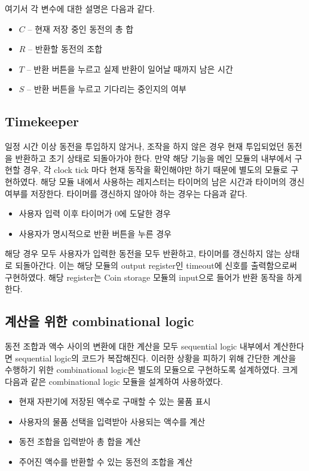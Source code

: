 \documentclass{scrartcl}
\begin{document}
여기서 각 변수에 대한 설명은 다음과 같다.

\begin{itemize}
  \item \(C\) -- 현재 저장 중인 동전의 총 합
  \item \(R\) -- 반환할 동전의 조합
  \item \(T\) -- 반환 버튼을 누르고 실제 반환이 일어날 때까지 남은 시간
  \item \(S\) -- 반환 버튼을 누르고 기다리는 중인지의 여부
\end{itemize}

\subsection{Timekeeper}
일정 시간 이상 동전을 투입하지 않거나, 조작을 하지 않은 경우 현재 투입되었던 동전을 반환하고 초기 상태로 되돌아가야 한다.
만약 해당 기능을 메인 모듈의 내부에서 구현할 경우, 각 clock tick 마다 현재 동작을 확인해야만 하기 때문에 별도의 모듈로
구현하였다.
해당 모듈 내에서 사용하는 레지스터는 타이머의 남은 시간과 타이머의 갱신 여부를 저장한다. 타이머를 갱신하지 않아야 하는 경우는
다음과 같다.

\begin{itemize}
  \item 사용자 입력 이후 타이머가 0에 도달한 경우
  \item 사용자가 명시적으로 반환 버튼을 누른 경우
\end{itemize}

해당 경우 모두 사용자가 입력한 동전을 모두 반환하고, 타이머를 갱신하지 않는 상태로 되돌아간다. 이는 해당 모듈의
output register인 timeout에 신호를 출력함으로써 구현하였다. 해당 register는 Coin storage 모듈의 input으로
들어가 반환 동작을 하게 한다.

\subsection{계산을 위한 combinational logic}
동전 조합과 액수 사이의 변환에 대한 계산을 모두 sequential logic 내부에서 계산한다면 sequential logic의 코드가
복잡해진다. 이러한 상황을 피하기 위해 간단한 계산을 수행하기 위한 combinational logic은 별도의 모듈으로 구현하도록
설계하였다. 크게 다음과 같은 combinational logic 모듈을 설계하여 사용하였다.

\begin{itemize}
  \item 현재 자판기에 저장된 액수로 구매할 수 있는 물품 표시
  \item 사용자의 물품 선택을 입력받아 사용되는 액수를 계산
  \item 동전 조합을 입력받아 총 합을 계산
  \item 주어진 액수를 반환할 수 있는 동전의 조합을 계산
\end{itemize}
\end{document}
